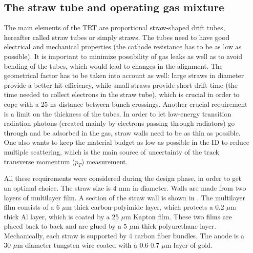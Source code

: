 
\subsection{The straw tube and operating gas mixture}

The main elements of the TRT are proportional straw-shaped drift tubes, hereafter called straw tubes or simply straws.
The tubes need to have good electrical and mechanical properties (the cathode resistance has to be as low as possible). It is important to minimize possibility of gas leaks as well as to avoid bending of the tubes, which would lead to changes in the alignment.
The geometrical factor has to be taken into account as well: large straws in diameter provide a better hit efficiency, while small straws provide short drift time (the time needed to collect electrons in the straw tube), which is crucial in order to cope with a 25 ns distance between bunch crossings.
Another crucial requirement is a limit on the thickness of the tubes. 
In order to let low-energy transition radiation photons (created mainly by electrons passing through radiators) go through and be adsorbed in the gas, straw walls need to be as thin as possible.
One also wants to keep the material budget as low as possible in the ID to reduce multiple scattering,
which is the main source of uncertainty of the track transverse momentum ($p_T$) measurement.

All these requirements were considered during the design phase, in order to get an optimal choice.
The straw size is 4 mm in diameter. Walls are made from two layers of multilayer film. A section of the straw wall is shown in .
The multilayer film consists of a 6 $\mu$m thick carbon-polyimide layer, which protects a 0.2 $\mu$m thick Al layer, which is coated by a 25 $\mu$m Kapton film.
These two films are placed back to back and are glued by a 5 $\mu$m thick polyurethane layer.
Mechanically, each straw is supported by 4 carbon fiber bundles.
The anode is a 30 $\mu$m diameter tungsten wire coated with a 0.6-0.7 $\mu$m layer of gold.

